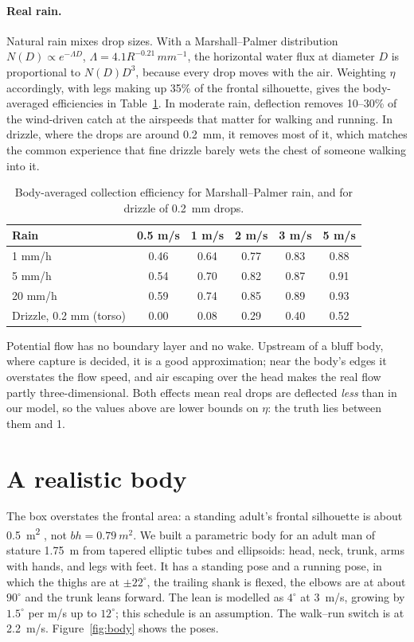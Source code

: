 \documentclass[11pt,a4paper]{article}
\begin{document}
\paragraph{Real rain.} Natural rain mixes drop sizes. With a Marshall--Palmer distribution $N(D)\propto e^{-\Lambda D}$, $\Lambda=4.1R^{-0.21}\,\si{mm^{-1}}$, the horizontal water flux at diameter $D$ is proportional to $N(D)D^3$, because every drop moves with the air. Weighting $\eta$ accordingly, with legs making up 35\% of the frontal silhouette, gives the body-averaged efficiencies in Table~\ref{tab:etamp}. In moderate rain, deflection removes 10--30\% of the wind-driven catch at the airspeeds that matter for walking and running. In drizzle, where the drops are around \SI{0.2}{mm}, it removes most of it, which matches the common experience that fine drizzle barely wets the chest of someone walking into it.

\begin{table}[h]\centering
\caption{Body-averaged collection efficiency for Marshall--Palmer rain, and for drizzle of \SI{0.2}{mm} drops.}\label{tab:etamp}
\begin{tabular}{lccccc}\toprule
Rain & 0.5 m/s & 1 m/s & 2 m/s & 3 m/s & 5 m/s\\\midrule
1 mm/h & 0.46 & 0.64 & 0.77 & 0.83 & 0.88\\
5 mm/h & 0.54 & 0.70 & 0.82 & 0.87 & 0.91\\
20 mm/h & 0.59 & 0.74 & 0.85 & 0.89 & 0.93\\
Drizzle, 0.2 mm (torso) & 0.00 & 0.08 & 0.29 & 0.40 & 0.52\\\bottomrule
\end{tabular}
\end{table}

Potential flow has no boundary layer and no wake. Upstream of a bluff body, where capture is decided, it is a good approximation; near the body's edges it overstates the flow speed, and air escaping over the head makes the real flow partly three-dimensional. Both effects mean real drops are deflected \emph{less} than in our model, so the values above are lower bounds on $\eta$: the truth lies between them and 1.

\section{A realistic body}\label{sec:body}
The box overstates the frontal area: a standing adult's frontal silhouette is about \SI{0.5}{m^2} \cite{pugh1971}, not $bh=\SI{0.79}{m^2}$. We built a parametric body for an adult man of stature \SI{1.75}{m} from tapered elliptic tubes and ellipsoids: head, neck, trunk, arms with hands, and legs with feet. It has a standing pose and a running pose, in which the thighs are at $\pm22^\circ$, the trailing shank is flexed, the elbows are at about $90^\circ$ and the trunk leans forward. The lean is modelled as $4^\circ$ at \SI{3}{m/s}, growing by $1.5^\circ$ per m/s up to $12^\circ$; this schedule is an assumption. The walk--run switch is at \SI{2.2}{m/s}. Figure~\ref{fig:body} shows the poses.
\end{document}
